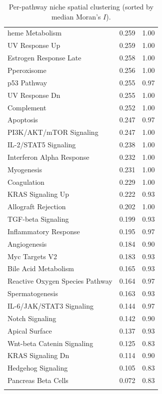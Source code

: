 \begin{longtable}{lrr}
heme Metabolism & 0.259 & 1.00\\
UV Response Up & 0.259 & 1.00\\
Estrogen Response Late & 0.258 & 1.00\\
Pperoxisome & 0.256 & 1.00\\
p53 Pathway & 0.255 & 0.97\\
UV Response Dn & 0.255 & 1.00\\
Complement & 0.252 & 1.00\\
Apoptosis & 0.247 & 0.97\\
PI3K/AKT/mTOR  Signaling & 0.247 & 1.00\\
IL-2/STAT5 Signaling & 0.238 & 1.00\\
Interferon Alpha Response & 0.232 & 1.00\\
Myogenesis & 0.231 & 1.00\\
Coagulation & 0.229 & 1.00\\
KRAS Signaling Up & 0.222 & 0.93\\
Allograft Rejection & 0.202 & 1.00\\
TGF-beta Signaling & 0.199 & 0.93\\
Inflammatory Response & 0.195 & 0.97\\
Angiogenesis & 0.184 & 0.90\\
Myc Targets V2 & 0.183 & 0.93\\
Bile Acid Metabolism & 0.165 & 0.93\\
Reactive Oxygen Species Pathway & 0.164 & 0.97\\
Spermatogenesis & 0.163 & 0.93\\
IL-6/JAK/STAT3 Signaling & 0.144 & 0.97\\
Notch Signaling & 0.142 & 0.90\\
Apical Surface & 0.137 & 0.93\\
Wnt-beta Catenin Signaling & 0.125 & 0.83\\
KRAS Signaling Dn & 0.114 & 0.90\\
Hedgehog Signaling & 0.105 & 0.83\\
Pancreas Beta Cells & 0.072 & 0.83\\
\hline\hline\caption{Per-pathway niche spatial clustering (sorted by median Moran's $I$).}\label{tab:niches}\end{longtable}
